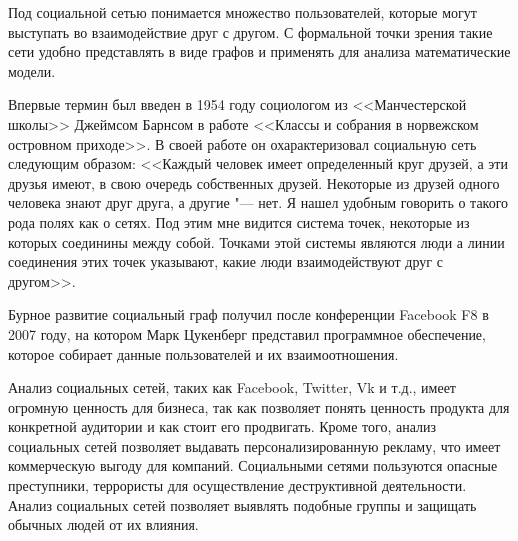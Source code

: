Под социальной сетью понимается множество пользователей, которые могут выступать во взаимодействие друг с другом. С формальной точки зрения такие сети удобно представлять в виде графов и применять для анализа математические модели.

Впервые термин был введен в 1954 году социологом из <<Манчестерской школы>> Джеймсом Барнсом в работе <<Классы и собрания в норвежском островном приходе>>. В своей работе он охарактеризовал социальную сеть следующим образом: <<Каждый человек имеет определенный круг друзей, а эти друзья имеют, в свою очередь собственных друзей. Некоторые из друзей одного человека знают друг друга, а другие "--- нет. Я нашел удобным говорить о такого рода полях как о сетях. Под этим мне видится система точек, некоторые из которых соединины между собой. Точками этой системы являются люди а линии соединения этих точек указывают, какие люди взаимодействуют друг с другом>>.\cite{Sazanov}

Бурное развитие социальный граф получил после конференции Facebook F8 в 2007 году, на котором Марк Цукенберг представил программное обеспечение, которое собирает данные пользователей и их взаимоотношения.\cite{CBSNews}

Анализ социальных сетей, таких как Facebook, Twitter, Vk и т.д., имеет огромную ценность для бизнеса, так как позволяет понять ценность продукта для конкретной аудитории и как стоит его продвигать. Кроме того, анализ социальных сетей позволяет выдавать персонализированную рекламу, что имеет коммерческую выгоду для компаний. Социальными сетями пользуются опасные преступники, террористы для осуществление деструктивной деятельности. Анализ социальных сетей позволяет выявлять подобные группы и защищать обычных людей от их влияния.\cite{hansen2010analyzing}